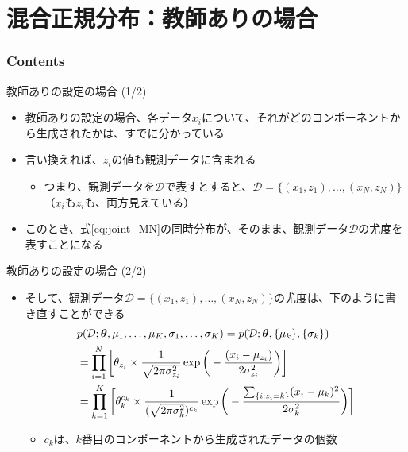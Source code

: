\documentclass[aspectratio=169,unicode,dvipdfmx,14pt]{beamer}
\begin{document}
\section{混合正規分布：教師ありの場合}

\begin{frame}\frametitle{Contents}
\Large \tableofcontents[currentsection]
\end{frame}


\begin{frame}{教師ありの設定の場合 (1/2)}
\begin{itemize}
\item 教師ありの設定の場合、各データ$x_i$について、それがどのコンポーネントから生成されたかは、すでに分かっている
\item 言い換えれば、$z_i$の値も観測データに含まれる
\begin{itemize}
\item つまり、観測データを$\mathcal{D}$で表すとすると、$\mathcal{D} = \{ (x_1,z_1), \ldots, (x_N,z_N) \}$
（$x_i$も$z_i$も、両方見えている）
\end{itemize}
\item このとき、式\eqref{eq:joint_MN}の同時分布が、そのまま、観測データ$\mathcal{D}$の尤度を表すことになる
\end{itemize}
\end{frame}

\begin{frame}{教師ありの設定の場合 (2/2)}
\begin{itemize}
\item そして、観測データ$\mathcal{D} = \{ (x_1,z_1), \ldots, (x_N,z_N) \}$の尤度は、下のように書き直すことができる
\vspace{-.15in}
\begin{align}
& p(\mathcal{D};\bm{\theta},\mu_1,\ldots,\mu_K,\sigma_1,\ldots,\sigma_K)
= p(\mathcal{D};\bm{\theta}, \{ \mu_k \}, \{ \sigma_k \} )
\notag \\ &
= \prod_{i=1}^N \bigg[ \theta_{z_i} \times \frac{1}{\sqrt{2\pi\sigma_{z_i}^2}}\exp\bigg( - \frac{(x_i - \mu_{z_i})}{2\sigma_{z_i}^2} \bigg) \bigg]
\notag \\ &
= \prod_{k=1}^K \bigg[ \theta_k^{c_k} \times \frac{1}{ (\sqrt{2\pi\sigma_k^2} )^{c_k}} 
\exp\bigg( - \frac{ \sum_{ \{ i : z_i = k \} } (x_i - \mu_k)^2 }{2\sigma_k^2} \bigg) \bigg]
\label{eq:likelihood_MN}
\end{align}
\vspace{-.15in}
\begin{itemize}
\item $c_k$は、$k$番目のコンポーネントから生成されたデータの個数
\end{itemize}
\end{itemize}
\end{frame}
\end{document}

